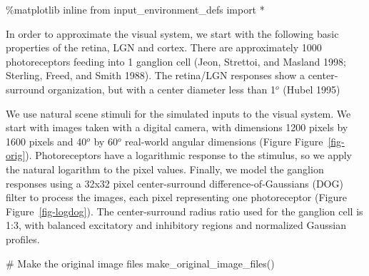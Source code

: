 \documentclass[
  letterpaper,
  DIV=11,
  numbers=noendperiod]{scrreprt}
\newenvironment{Shaded}{\begin{snugshade}}{\end{snugshade}}
\newcommand{\CommentTok}[1]{\textcolor[rgb]{0.37,0.37,0.37}{#1}}
\newcommand{\ImportTok}[1]{\textcolor[rgb]{0.00,0.46,0.62}{#1}}
\newcommand{\NormalTok}[1]{\textcolor[rgb]{0.00,0.23,0.31}{#1}}
\newcommand{\OperatorTok}[1]{\textcolor[rgb]{0.37,0.37,0.37}{#1}}
\begin{document}
\begin{Shaded}
\begin{Highlighting}[]
\OperatorTok{\%}\NormalTok{matplotlib inline}
\ImportTok{from}\NormalTok{ input\_environment\_defs }\ImportTok{import} \OperatorTok{*}
\end{Highlighting}
\end{Shaded}

In order to approximate the visual system, we start with the following
basic properties of the retina, LGN and cortex. There are approximately
1000 photoreceptors feeding into 1 ganglion cell (Jeon, Strettoi, and
Masland 1998; Sterling, Freed, and Smith 1988). The retina/LGN responses
show a center-surround organization, but with a center diameter less
than 1\(^o\) (Hubel 1995)

We use natural scene stimuli for the simulated inputs to the visual
system. We start with images taken with a digital camera, with
dimensions 1200 pixels by 1600 pixels and 40\(^o\) by 60\(^o\)
real-world angular dimensions (Figure Figure~\ref{fig-orig}).
Photoreceptors have a logarithmic response to the stimulus, so we apply
the natural logarithm to the pixel values. Finally, we model the
ganglion responses using a 32x32 pixel center-surround
difference-of-Gaussians (DOG) filter to process the images, each pixel
representing one photoreceptor (Figure Figure~\ref{fig-logdog}). The
center-surround radius ratio used for the ganglion cell is 1:3, with
balanced excitatory and inhibitory regions and normalized Gaussian
profiles.

\begin{Shaded}
\begin{Highlighting}[]
\CommentTok{\# Make the original image files}
\NormalTok{make\_original\_image\_files()}

\end{Highlighting}
\end{Shaded}
\end{document}

